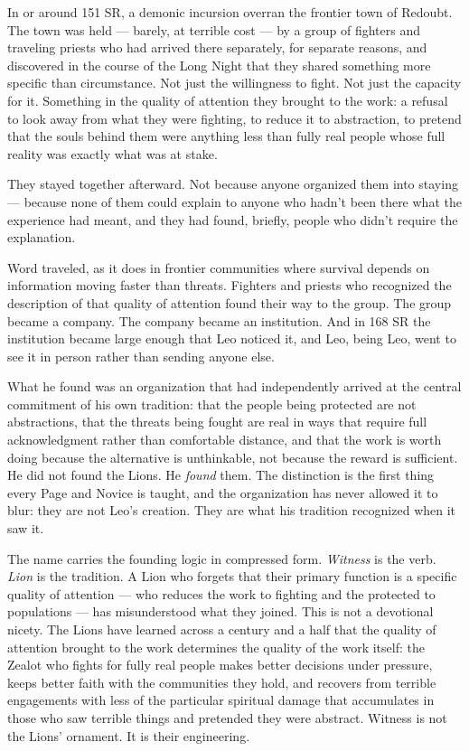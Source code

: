 In or around 151 SR, a demonic incursion overran the frontier town of Redoubt. The town was held --- barely, at terrible cost --- by a group of fighters and traveling priests who had arrived there separately, for separate reasons, and discovered in the course of the Long Night that they shared something more specific than circumstance. Not just the willingness to fight. Not just the capacity for it. Something in the quality of attention they brought to the work: a refusal to look away from what they were fighting, to reduce it to abstraction, to pretend that the souls behind them were anything less than fully real people whose full reality was exactly what was at stake.

They stayed together afterward. Not because anyone organized them into staying --- because none of them could explain to anyone who hadn't been there what the experience had meant, and they had found, briefly, people who didn't require the explanation.

Word traveled, as it does in frontier communities where survival depends on information moving faster than threats. Fighters and priests who recognized the description of that quality of attention found their way to the group. The group became a company. The company became an institution. And in 168 SR the institution became large enough that Leo noticed it, and Leo, being Leo, went to see it in person rather than sending anyone else.

What he found was an organization that had independently arrived at the central commitment of his own tradition: that the people being protected are not abstractions, that the threats being fought are real in ways that require full acknowledgment rather than comfortable distance, and that the work is worth doing because the alternative is unthinkable, not because the reward is sufficient. He did not found the Lions. He \textit{found} them. The distinction is the first thing every Page and Novice is taught, and the organization has never allowed it to blur: they are not Leo's creation. They are what his tradition recognized when it saw it.

The name carries the founding logic in compressed form. \textit{Witness} is the verb. \textit{Lion} is the tradition. A Lion who forgets that their primary function is a specific quality of attention --- who reduces the work to fighting and the protected to populations --- has misunderstood what they joined. This is not a devotional nicety. The Lions have learned across a century and a half that the quality of attention brought to the work determines the quality of the work itself: the Zealot who fights for fully real people makes better decisions under pressure, keeps better faith with the communities they hold, and recovers from terrible engagements with less of the particular spiritual damage that accumulates in those who saw terrible things and pretended they were abstract. Witness is not the Lions' ornament. It is their engineering.

